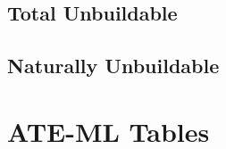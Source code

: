 \documentclass{article}
\begin{document}
{	\subsection{Total Unbuildable}
	
	\clearpage
%	
	\subsection{Naturally Unbuildable}
	
	\clearpage
	
}

\section{ATE-ML Tables}
\clearpage
%

%

\end{document}

